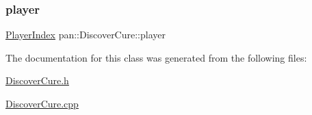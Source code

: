 \mbox{\label{classpan_1_1_discover_cure_a32a25e9bc1bb54c98d9a96c47c991ed7}} 
\subsubsection{\texorpdfstring{player}{player}}
{\footnotesize\ttfamily \hyperlink{namespacepan_a0cdabf874fbf1bb3a1f0152d108c2909}{Player\+Index} pan\+::\+Discover\+Cure\+::player}



The documentation for this class was generated from the following files\+:\begin{DoxyCompactItemize}
\item 
\hyperlink{_discover_cure_8h}{Discover\+Cure.\+h}\item 
\hyperlink{_discover_cure_8cpp}{Discover\+Cure.\+cpp}\end{DoxyCompactItemize}
